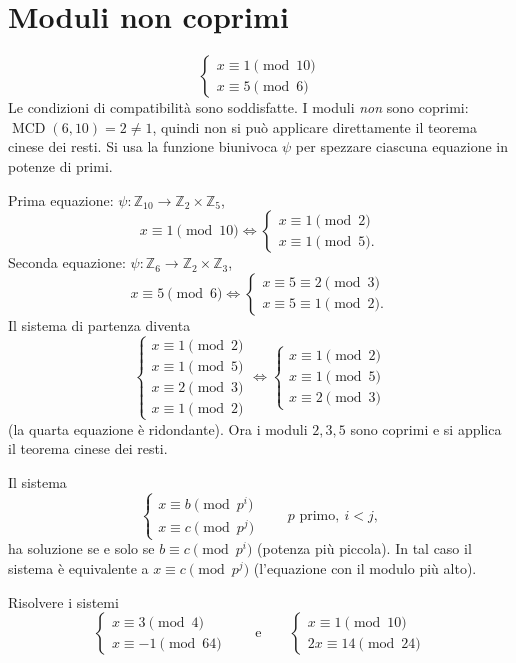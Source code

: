 \documentclass[11pt,a4paper]{article}
\begin{document}
\section{Moduli non coprimi}

\begin{esempio}
\[
  \begin{cases} x \equiv 1 \pmod{10} \\ x \equiv 5 \pmod 6 \end{cases}
\]
Le condizioni di compatibilità sono soddisfatte. I moduli \emph{non} sono coprimi: $\operatorname{MCD}(6, 10) = 2 \neq 1$, quindi non si può applicare direttamente il teorema cinese dei resti. Si usa la funzione biunivoca $\psi$ per spezzare ciascuna equazione in potenze di primi.

Prima equazione: $\psi : \mathbb{Z}_{10} \to \mathbb{Z}_2\times\mathbb{Z}_5$,
\[
  x \equiv 1 \pmod{10} \iff \begin{cases} x \equiv 1 \pmod 2 \\ x \equiv 1 \pmod 5. \end{cases}
\]
Seconda equazione: $\psi : \mathbb{Z}_6 \to \mathbb{Z}_2\times\mathbb{Z}_3$,
\[
  x \equiv 5 \pmod 6 \iff \begin{cases} x \equiv 5 \equiv 2 \pmod 3 \\ x \equiv 5 \equiv 1 \pmod 2. \end{cases}
\]
Il sistema di partenza diventa
\[
  \begin{cases} x \equiv 1 \pmod 2 \\ x \equiv 1 \pmod 5 \\ x \equiv 2 \pmod 3 \\ x \equiv 1 \pmod 2 \end{cases}
  \iff
  \begin{cases} x \equiv 1 \pmod 2 \\ x \equiv 1 \pmod 5 \\ x \equiv 2 \pmod 3 \end{cases}
\]
(la quarta equazione è ridondante). Ora i moduli $2, 3, 5$ sono coprimi e si applica il teorema cinese dei resti.
\end{esempio}

\begin{osservazione}
Il sistema
\[
  \begin{cases} x \equiv b \pmod{p^i} \\ x \equiv c \pmod{p^j} \end{cases} \qquad p \text{ primo},\ i < j,
\]
ha soluzione se e solo se $b \equiv c \pmod{p^i}$ (potenza più piccola). In tal caso il sistema è equivalente a $x \equiv c \pmod{p^j}$ (l'equazione con il modulo più alto).
\end{osservazione}

\begin{esercizio}
Risolvere i sistemi
\[
  \begin{cases} x \equiv 3 \pmod 4 \\ x \equiv -1 \pmod{64} \end{cases}
  \qquad\text{e}\qquad
  \begin{cases} x \equiv 1 \pmod{10} \\ 2x \equiv 14 \pmod{24} \end{cases}
\]
\end{esercizio}
\end{document}
